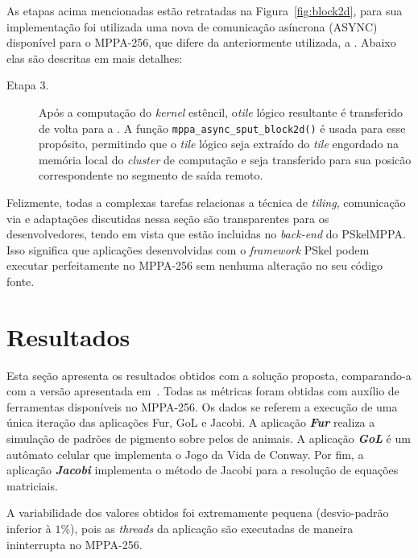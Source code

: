 \documentclass[a4paper,11pt]{article}
\newcommand{\mppa}{MPPA-256\xspace}
\newcommand{\fw}{\textit{framework}\xspace}
\begin{document}
As etapas acima mencionadas estão retratadas na Figura~\ref{fig:block2d}, para sua implementação foi utilizada uma nova \api de comunicação asíncrona (ASYNC) disponível para o \mppa, que difere da \api anteriormente utilizada, a \ipc. Abaixo elas são descritas em mais detalhes:

\begin{description}




	\item[Etapa 3.] Após a computação do \emph{kernel} estêncil, o\emph{tile} lógico resultante é transferido de volta para a \lpddr. A função \texttt{mppa\_async\_sput\_block2d()} é usada para esse propósito, permitindo que o \emph{tile} lógico seja extraído do \emph{tile} engordado na memória local do \emph{cluster} de computação e seja transferido para sua posicão correspondente no segmento de saída remoto.

\end{description}

Felizmente, todas a complexas tarefas relacionas a técnica de \emph{tiling}, comunicação via \noc e adaptações discutidas nessa seção são transparentes para os desenvolvedores, tendo em vista que estão incluidas no \emph{back-end} do PSkelMPPA. Isso significa que aplicações desenvolvidas com o \fw PSkel podem executar perfeitamente no \mppa sem nenhuma alteração no seu código fonte.

\section{Resultados}
\label{sec:resultados}

Esta seção apresenta os resultados obtidos com a solução proposta, comparando-a com a versão apresentada em~\cite{PodestaJr.2017}.
Todas as métricas foram obtidas com auxílio de ferramentas disponíveis no \mppa.
Os dados se referem a execução de uma única iteração das aplicações Fur, GoL e Jacobi.
A aplicação \textbf{\textit{Fur}} realiza a simulação de padrões de pigmento sobre
pelos de animais. A aplicação \textbf{\textit{GoL}} é um autômato celular que
implementa o Jogo da Vida de Conway. Por fim, a aplicação
\textbf{\textit{Jacobi}} implementa o método de Jacobi para a resolução de equações matriciais.

A variabilidade dos valores obtidos foi extremamente pequena (desvio-padrão inferior à $1\%$), pois as \textit{threads} da aplicação são executadas de maneira ininterrupta no \mppa.
\end{document}
